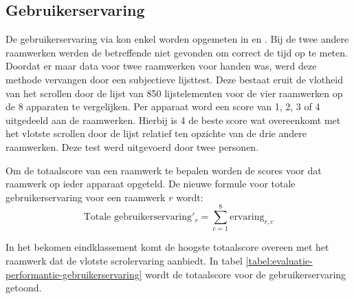 \subsection{Gebruikerservaring}
\label{sec:evaluatie-gebruikerservaring}
De gebruikerservaring via \js{} kon enkel worden opgemeten in \jqm{} en \kendo{}.
Bij de twee andere raamwerken werden de betreffende  niet gevonden om correct de tijd op te meten.
Doordat er maar data voor twee raamwerken voor handen was, werd deze methode vervangen door een subjectieve lijsttest.
Deze bestaat eruit de vlotheid van het scrollen door de lijst van 850 lijstelementen voor de vier raamwerken op de 8 apparaten te vergelijken.
Per apparaat word een score van 1, 2, 3 of 4 uitgedeeld aan de raamwerken.
Hierbij is 4 de beste score wat overeenkomt met het vlotste scrollen door de lijst relatief ten opzichte van de drie andere raamwerken.
Deze test werd uitgevoerd door twee personen.

Om de totaalscore van een raamwerk te bepalen worden de scores voor dat raamwerk op ieder apparaat opgeteld. De nieuwe formule voor totale gebruikerservaring voor een raamwerk $r$ wordt:
\begin{equation}
  \text{Totale gebruikerservaring}'_r = \sum_{c=1}^{8}{\text{ervaring}_{r,c}}
  \label{eq:performantie-enhanced}
\end{equation}

In het bekomen eindklassement komt de hoogste totaalscore overeen met het raamwerk dat de vlotste scrolervaring aanbiedt. In tabel \ref{tabel:evaluatie-performantie-gebruikerservaring} wordt de totaalscore voor de gebruikerservaring getoond.

\begin{table}[H]
\centering
{}
\caption{Gebruikerservaring voor \st{}~(\sta), \kendo{}~(\kendoa), \jqm{}~(\jqma) en \lungo{}~(\lungoa).}
\label{tabel:evaluatie-performantie-gebruikerservaring}
\end{table}

